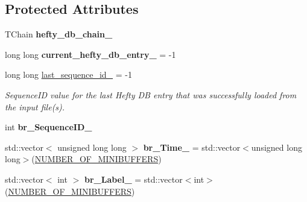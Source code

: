 \subsection*{Protected Attributes}
\begin{DoxyCompactItemize}
\item 
\hypertarget{classannie_1_1HeftyTreeReader_a2f6016952ec8fc83955a081115eb2cb5}{
TChain {\bfseries hefty\_\-db\_\-chain\_\-}}
\label{classannie_1_1HeftyTreeReader_a2f6016952ec8fc83955a081115eb2cb5}

\item 
\hypertarget{classannie_1_1HeftyTreeReader_a4e71c6e864c27fe549da00eb42d0aff0}{
long long {\bfseries current\_\-hefty\_\-db\_\-entry\_\-} = -\/1}
\label{classannie_1_1HeftyTreeReader_a4e71c6e864c27fe549da00eb42d0aff0}

\item 
\hypertarget{classannie_1_1HeftyTreeReader_ae8a407035678cd910f1a5a6a7ccef830}{
long long \hyperlink{classannie_1_1HeftyTreeReader_ae8a407035678cd910f1a5a6a7ccef830}{last\_\-sequence\_\-id\_\-} = -\/1}
\label{classannie_1_1HeftyTreeReader_ae8a407035678cd910f1a5a6a7ccef830}

\begin{DoxyCompactList}\small\item\em SequenceID value for the last Hefty DB entry that was successfully loaded from the input file(s). \item\end{DoxyCompactList}\item 
\hypertarget{classannie_1_1HeftyTreeReader_a5a38c0a83f580383467151e1140154dd}{
int {\bfseries br\_\-SequenceID\_\-}}
\label{classannie_1_1HeftyTreeReader_a5a38c0a83f580383467151e1140154dd}

\item 
\hypertarget{classannie_1_1HeftyTreeReader_a89d2ab671487ff45f0589bc0f2482191}{
std::vector$<$ unsigned long long $>$ {\bfseries br\_\-Time\_\-} = std::vector$<$unsigned long long$>$(\hyperlink{classannie_1_1HeftyTreeReader_a3ed132051c32e82aa67c7df43eacd77c}{NUMBER\_\-OF\_\-MINIBUFFERS})}
\label{classannie_1_1HeftyTreeReader_a89d2ab671487ff45f0589bc0f2482191}

\item 
\hypertarget{classannie_1_1HeftyTreeReader_acf32379d810b8a05d2b67f6896efecf2}{
std::vector$<$ int $>$ {\bfseries br\_\-Label\_\-} = std::vector$<$int$>$(\hyperlink{classannie_1_1HeftyTreeReader_a3ed132051c32e82aa67c7df43eacd77c}{NUMBER\_\-OF\_\-MINIBUFFERS})}
\label{classannie_1_1HeftyTreeReader_acf32379d810b8a05d2b67f6896efecf2}


\end{DoxyCompactItemize}
